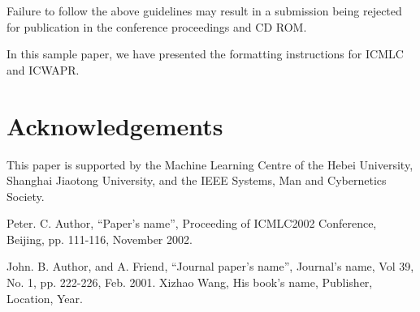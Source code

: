\documentclass[a4paper, times, 10pt,twocolumn]{article}
\begin{document}
Failure to follow the above guidelines may result in a submission
being rejected for publication in the conference proceedings and CD
ROM.

\newpage

In this sample paper, we have presented the formatting instructions
for ICMLC and ICWAPR.



\section*{Acknowledgements}

This paper is supported by the Machine Learning Centre of the Hebei
University, Shanghai Jiaotong University, and the IEEE Systems, Man
and Cybernetics Society.

%
%

\begin{thebibliography}{99}
Peter. C. Author, ``Paper's name'', Proceeding of ICMLC2002
Conference, Beijing, pp. 111-116, November 2002.

 John. B. Author, and A. Friend, ``Journal paper's name'', Journal's
name, Vol 39, No. 1, pp. 222-226, Feb. 2001.
 Xizhao Wang, His book's name, Publisher, Location, Year.
\end{thebibliography}
\end{document}
